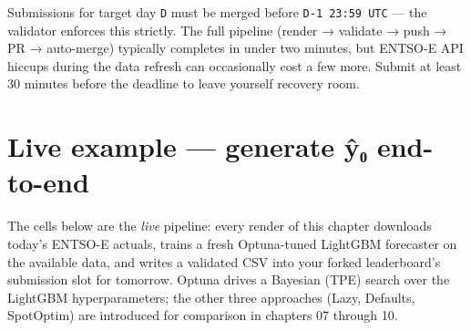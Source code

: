 \documentclass[
  english,
  letterpaper,
]{scrbook}
\begin{document}
\begin{tcolorbox}[enhanced jigsaw, arc=.35mm, bottomrule=.15mm, bottomtitle=1mm, breakable, colback=white, colbacktitle=quarto-callout-warning-color!10!white, colframe=quarto-callout-warning-color-frame, coltitle=black, left=2mm, leftrule=.75mm, opacityback=0, opacitybacktitle=0.6, rightrule=.15mm, title=\textcolor{quarto-callout-warning-color}{\faExclamationTriangle}\hspace{0.5em}{Deadline}, titlerule=0mm, toprule=.15mm, toptitle=1mm]

Submissions for target day \texttt{D} must be merged before
\texttt{D-1\ 23:59\ UTC} --- the validator enforces this strictly. The
full pipeline (render → validate → push → PR → auto-merge) typically
completes in under two minutes, but ENTSO-E API hiccups during the data
refresh can occasionally cost a few more. Submit at least 30 minutes
before the deadline to leave yourself recovery room.

\end{tcolorbox}

\section{Live example --- generate ŷ₀
end-to-end}\label{sec-live-example}

The cells below are the \emph{live} pipeline: every render of this
chapter downloads today's ENTSO-E actuals, trains a fresh Optuna-tuned
LightGBM forecaster on the available data, and writes a validated CSV
into your forked leaderboard's submission slot for tomorrow. Optuna
drives a Bayesian (TPE) search over the LightGBM hyperparameters; the
other three approaches (Lazy, Defaults, SpotOptim) are introduced for
comparison in chapters 07 through 10.
\end{document}
